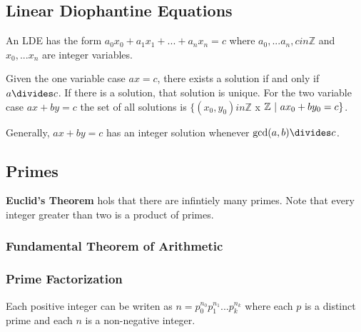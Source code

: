 \documentclass[12pt]{article}
\begin{document}

\subsection*{Linear Diophantine Equations}
 An LDE has the form $a_0x_0 + a_1x_1 + ... + a_nx_n = c$ where $a_0, ... a_n, c in \mathbb{Z}$ and $x_0, ... x_n$ are integer variables.

Given the one variable case $ax = c$, there exists a solution if and only if $a \divides c$. If there is a solution, that solution is unique. For the two variable case $ax + by = c$ the set of all solutions is $\{ (x_0, y_0) in \mathbb{Z}$ x $\mathbb{Z} \ |\  ax_0 + by_0 = c \}$.

Generally, $ax + by = c$ has an integer solution whenever $\gcd(a,b) \divides c$.



\subsection*{Primes}
{\bf Euclid's Theorem} hols that there are infintiely many primes. Note that every integer greater than two is a product of primes.


\subsubsection*{Fundamental Theorem of Arithmetic}

\subsubsection*{Prime Factorization}
Each positive integer can be writen as $n = p_0^{n_0} p_1^{n_1} ... p_k^{n_k}$ where each $p$ is a distinct prime and each $n$ is a non-negative integer.
\end{document}
